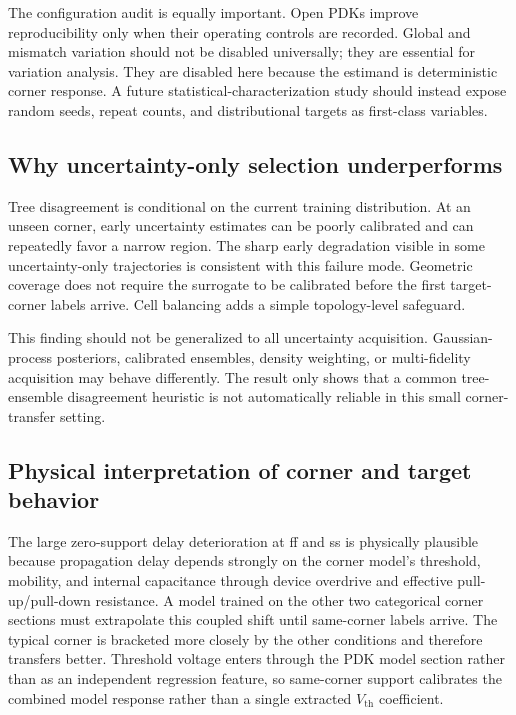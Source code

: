 \documentclass[preprint,12pt]{elsarticle}
\begin{document}
The configuration audit is equally important. Open PDKs improve reproducibility only when their operating controls are recorded. Global and mismatch variation should not be disabled universally; they are essential for variation analysis. They are disabled here because the estimand is deterministic corner response. A future statistical-characterization study should instead expose random seeds, repeat counts, and distributional targets as first-class variables.

\subsection{Why uncertainty-only selection underperforms}

Tree disagreement is conditional on the current training distribution. At an unseen corner, early uncertainty estimates can be poorly calibrated and can repeatedly favor a narrow region. The sharp early degradation visible in some uncertainty-only trajectories is consistent with this failure mode. Geometric coverage does not require the surrogate to be calibrated before the first target-corner labels arrive. Cell balancing adds a simple topology-level safeguard.

This finding should not be generalized to all uncertainty acquisition. Gaussian-process posteriors, calibrated ensembles, density weighting, or multi-fidelity acquisition may behave differently. The result only shows that a common tree-ensemble disagreement heuristic is not automatically reliable in this small corner-transfer setting.

\subsection{Physical interpretation of corner and target behavior}

The large zero-support delay deterioration at ff and ss is physically plausible because propagation delay depends strongly on the corner model's threshold, mobility, and internal capacitance through device overdrive and effective pull-up/pull-down resistance. A model trained on the other two categorical corner sections must extrapolate this coupled shift until same-corner labels arrive. The typical corner is bracketed more closely by the other conditions and therefore transfers better. Threshold voltage enters through the PDK model section rather than as an independent regression feature, so same-corner support calibrates the combined model response rather than a single extracted $V_{\mathrm{th}}$ coefficient.
\end{document}
